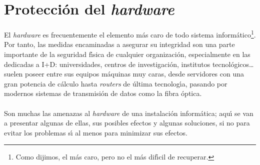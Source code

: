 \section{Protecci\'on del {\it hardware}}
El {\it hardware} es frecuentemente el elemento m\'as caro de todo sistema
inform\'atico\footnote{Como dijimos, el m\'as caro, pero no el m\'as 
dif\'{\i}cil de recuperar.}. Por tanto, las medidas encaminadas a asegurar 
su integridad son una parte importante de la seguridad f\'{\i}sica de cualquier
organizaci\'on, especialmente en las dedicadas a I+D: universidades, centros
de investigaci\'on, institutos tecnol\'ogicos\ldots suelen poseer entre sus
equipos m\'aquinas muy caras, desde servidores con una gran potencia de 
c\'alculo hasta {\it routers} de \'ultima tecnolog\'{\i}a, pasando por modernos
sistemas de transmisi\'on de datos como la fibra \'optica.\\
\\Son muchas las amenazas al {\it hardware} de una instalaci\'on inform\'atica;
aqu\'{\i} se van a presentar algunas de ellas, sus posibles efectos y algunas
soluciones, si no para evitar los problemas s\'{\i} al menos para minimizar sus
efectos.

